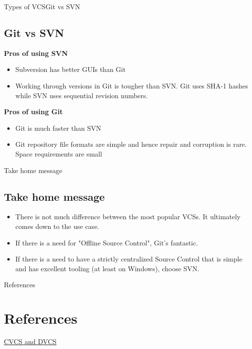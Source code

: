 \documentclass{beamer}
\begin{document}
\begin{frame}{Types of VCS}{Git vs SVN}
\subsection{Git vs SVN}

\textbf{Pros of using SVN}
\begin{itemize}
    \item Subversion has better GUIs than Git
    \item Working through versions in Git is tougher than SVN. Git uses SHA-1 hashes while SVN uses sequential revision numbers.    
\end{itemize}
\textbf{Pros of using Git}
\begin{itemize}
    \item Git is much faster than SVN
    \item Git repository file formats are simple and hence  repair and corruption is rare. Space requirements are small
\end{itemize}
\end{frame}

\begin{frame}{Take home message}
\subsection{Take home message}
\begin{itemize}
    \item There is not much difference between the most popular VCSs. It ultimately comes down to the use case.
    \item If there is a need for "Offline Source Control", Git's fantastic. 
    \item If there is a need to have a strictly centralized Source Control that is simple and has excellent tooling (at least on Windows), choose SVN.
\end{itemize}
    
\end{frame}

\begin{frame}{References}
  \section{References}
    
  \begin{thebibliography}{10}

	\href{https://www.appfusions.com/display/StashSCMImporter/CVCS+vs.+DVCS+In+a+Nutshell
}{CVCS and DVCS}

  \end{thebibliography}
\end{frame}
\end{document}
